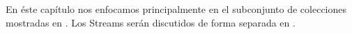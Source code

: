 \documentclass[a4paper,10pt,twoside]{book}
\begin{document}



En \'este cap\'itulo nos enfocamos principalmente en el subconjunto de colecciones mostradas en .
Los Streams ser\'an discutidos de forma separada en .


\end{document}
